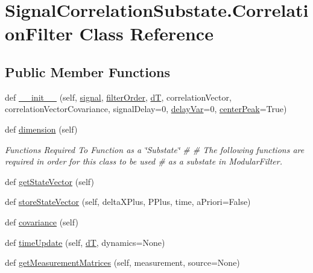 \hypertarget{classSignalCorrelationSubstate_1_1CorrelationFilter}{}\section{Signal\+Correlation\+Substate.\+Correlation\+Filter Class Reference}
\label{classSignalCorrelationSubstate_1_1CorrelationFilter}
\subsection*{Public Member Functions}
\begin{DoxyCompactItemize}
\item 
def \hyperlink{classSignalCorrelationSubstate_1_1CorrelationFilter_a824dfd77c5bb3cdafac7436147fe28fe}{\+\_\+\+\_\+init\+\_\+\+\_\+} (self, \hyperlink{classSignalCorrelationSubstate_1_1CorrelationFilter_aa8d4b67731322e27598866d1cec84877}{signal}, \hyperlink{classSignalCorrelationSubstate_1_1CorrelationFilter_a4b49b7bd52c1346cca0342942a5bbbb6}{filter\+Order}, \hyperlink{classSignalCorrelationSubstate_1_1CorrelationFilter_a500e4823c314d54a21f236b6b896c8eb}{dT}, correlation\+Vector, correlation\+Vector\+Covariance, signal\+Delay=0, \hyperlink{classSignalCorrelationSubstate_1_1CorrelationFilter_a34d52beb18c131f2305689d48f612a5a}{delay\+Var}=0, \hyperlink{classSignalCorrelationSubstate_1_1CorrelationFilter_a8e53182c2ff431a6a545a265cda6ba48}{center\+Peak}=True)
\item 
def \hyperlink{classSignalCorrelationSubstate_1_1CorrelationFilter_a6f498c6905d1c8aab4efef99a98b353e}{dimension} (self)
\begin{DoxyCompactList}\small\item\em Functions Required To Function as a \char`\"{}\+Substate\char`\"{} \# \# The following functions are required in order for this class to be used \# as a substate in Modular\+Filter. \end{DoxyCompactList}\item 
def \hyperlink{classSignalCorrelationSubstate_1_1CorrelationFilter_ad5a7ad0c1796ca7ba7e0f25d4e553478}{get\+State\+Vector} (self)
\item 
def \hyperlink{classSignalCorrelationSubstate_1_1CorrelationFilter_af7eb96af58ba70eefcf85a3529939afe}{store\+State\+Vector} (self, delta\+X\+Plus, P\+Plus, time, a\+Priori=False)
\item 
def \hyperlink{classSignalCorrelationSubstate_1_1CorrelationFilter_a134b27eecbbcdab8ebe31ed3e8aaf186}{covariance} (self)
\item 
def \hyperlink{classSignalCorrelationSubstate_1_1CorrelationFilter_a07a8c37a30c3d0a057049e0ff2eac67f}{time\+Update} (self, \hyperlink{classSignalCorrelationSubstate_1_1CorrelationFilter_a500e4823c314d54a21f236b6b896c8eb}{dT}, dynamics=None)
\item 
def \hyperlink{classSignalCorrelationSubstate_1_1CorrelationFilter_ae7338456be781e322eba5bce4e41199f}{get\+Measurement\+Matrices} (self, measurement, source=None)
\end{DoxyCompactItemize}
